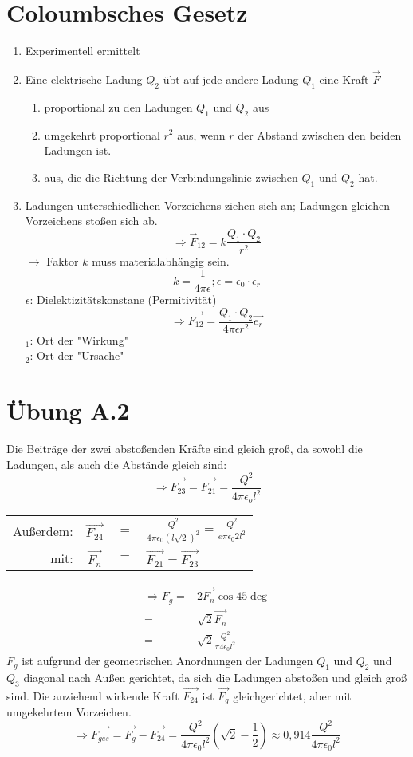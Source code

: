 \documentclass{article}
\begin{document}
\section{Coloumbsches Gesetz}
\begin{enumerate}
	\item Experimentell ermittelt
	\item Eine elektrische Ladung $Q_2$ übt auf jede andere Ladung $Q_1$ eine Kraft $\vec{F}$
	\begin{enumerate}
		\item proportional zu den Ladungen $Q_1$ und $Q_2$ aus
		\item umgekehrt proportional $r^2$ aus, wenn $r$ der Abstand zwischen den beiden Ladungen ist.
		\item aus, die die Richtung der Verbindungslinie zwischen $Q_1$ und $Q_2$ hat.
	\end{enumerate}
	\item Ladungen unterschiedlichen Vorzeichens ziehen sich an; Ladungen gleichen Vorzeichens stoßen sich ab.
	$$\Rightarrow \vec{F}_{12} = k\frac{Q_1\cdot Q_2}{r^2}$$
	$\rightarrow$ Faktor $k$ muss materialabhängig sein.
	$$k=\frac{1}{4\pi\epsilon};  \epsilon=\epsilon_0\cdot\epsilon_r$$
	$\epsilon$: Dielektizitätskonstane (Permitivität)
	$$\Rightarrow \vec{F_{12}} = \frac{Q_1\cdot Q_2}{4\pi\epsilon r^2}\vec{e_r}$$
	$_1$: Ort der "Wirkung"\\
	$_2$: Ort der "Ursache"
\end{enumerate}
\section{Übung A.2}
Die Beiträge der zwei abstoßenden Kräfte sind gleich groß, da sowohl die Ladungen, als auch die Abstände gleich sind:
$$\Rightarrow \vec{F_{23}} = \vec{F_{21}} = \frac{Q^2}{4\pi\epsilon_o l^2}$$
\begin{center}
\begin{tabular}{r c c l}
Außerdem: & $\vec{F_{24}}$&$=$&$\frac{Q^2}{4\pi\epsilon_0 (l\sqrt{2})^2} = \frac{Q^2}{e\pi\epsilon_0 2l^2}$\\
mit: & $\vec{F_n}$&$=$&$\vec{F_{21}} = \vec{F_{23}}$
\end{tabular}
\end{center}
\begin{align*}
\Rightarrow F_g =& 2\vec{F_n}\cos 45\deg\\
=& \sqrt{2}\vec{F_n}\\
=& \sqrt{2}\frac{Q^2}{\pi 4 \epsilon_0 l^2}
\end{align*}
$F_g$ ist aufgrund der geometrischen Anordnungen der Ladungen $Q_1$ und $Q_2$ und $Q_3$ diagonal nach Außen gerichtet, da sich die Ladungen abstoßen und gleich groß sind. Die anziehend wirkende Kraft $\vec{F_{24}}$ ist $\vec{F_g}$ gleichgerichtet, aber mit umgekehrtem Vorzeichen.
$$\Rightarrow \vec{F_{ges}}=\vec{F_g}-\vec{F_{24}}=\frac{Q^2}{4\pi\epsilon_0 l^2}(\sqrt{2}-\frac{1}{2})\approx 0,914\frac{Q^2}{4\pi\epsilon_0 l^2}$$
\end{document}

